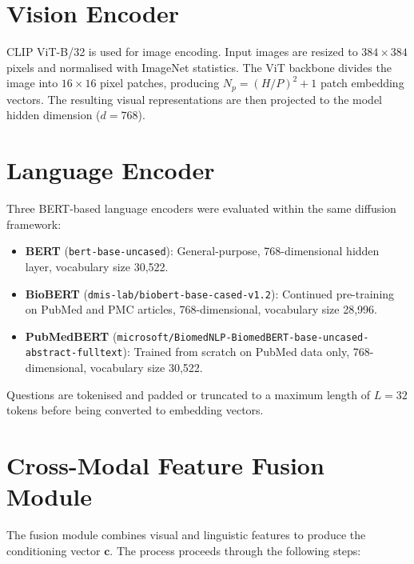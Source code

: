 \documentclass[9pt]{report}
\begin{document}
\section{Vision Encoder}

CLIP ViT-B/32 is used for image encoding. Input images are resized to $384 \times 384$ pixels and normalised with ImageNet statistics. The ViT backbone divides the image into $16 \times 16$ pixel patches, producing $N_p = (H/P)^2 + 1$ patch embedding vectors. The resulting visual representations are then projected to the model hidden dimension ($d = 768$).

\section{Language Encoder}

Three BERT-based language encoders were evaluated within the same diffusion framework:

\begin{itemize}
    \item \textbf{BERT} (\texttt{bert-base-uncased}): General-purpose, 768-dimensional hidden layer, vocabulary size 30,522.
    \item \textbf{BioBERT} (\texttt{dmis-lab/biobert-base-cased-v1.2}): Continued pre-training on PubMed and PMC articles, 768-dimensional, vocabulary size 28,996.
    \item \textbf{PubMedBERT} (\texttt{microsoft/BiomedNLP-BiomedBERT-base-uncased-abstract-fulltext}): Trained from scratch on PubMed data only, 768-dimensional, vocabulary size 30,522.
\end{itemize}

Questions are tokenised and padded or truncated to a maximum length of $L = 32$ tokens before being converted to embedding vectors.

\section{Cross-Modal Feature Fusion Module}

The fusion module combines visual and linguistic features to produce the conditioning vector $\mathbf{c}$. The process proceeds through the following steps:
\end{document}
